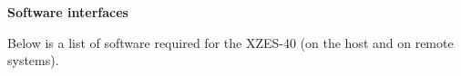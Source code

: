 \textbf{Software interfaces}

Below is a list of software required for the XZES-40 (on the host and on remote systems).

